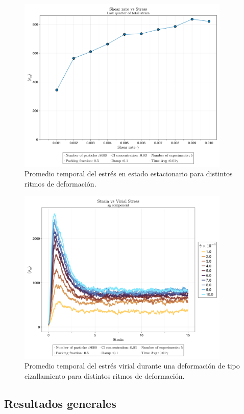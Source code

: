 \documentclass[../main.tex]{subfiles}
\begin{document}
\begin{figure}[h]
    \centering
    \includegraphics[width=0.9\textwidth]{../Figures/system-2025-05-22-194804-CL-0.03/ShearRate-vs-Stress.png}
    \caption{
        Promedio temporal del estrés en estado estacionario para distintos ritmos de deformación.
    }\label{fig:shear-rate-vs-stress}
\end{figure}

\begin{figure}[h]
    \centering
    \includegraphics[width=0.9\textwidth]{../Figures/system-2025-05-22-194804-CL-0.03/Strain-vs-StressVirialXY.png}
    \caption{
        Promedio temporal del estrés virial durante una deformación de tipo cizallamiento para distintos ritmos de deformación.
    }\label{fig:strain-vs-stress}
\end{figure}



\subsection{Resultados generales}
\end{document}
